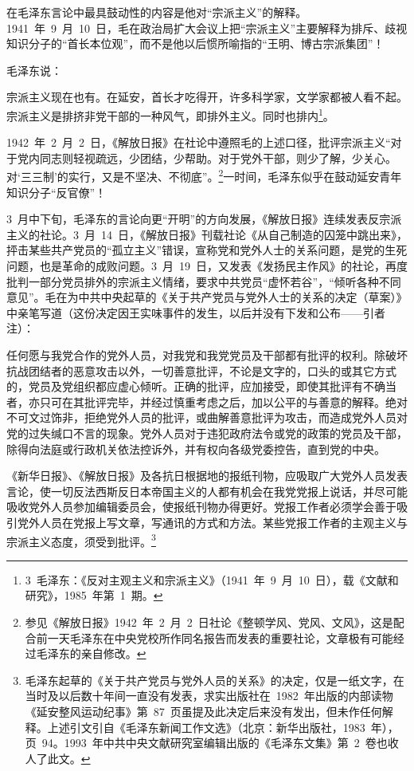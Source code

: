 在毛泽东言论中最具鼓动性的内容是他对“宗派主义”的解释。1941~年~9~月~10~日，毛在政治局扩大会议上把“宗派主义”主要解释为排斥、歧视知识分子的“首长本位观”，而不是他以后惯所喻指的“王明、博古宗派集团”！

毛泽东说：

\begin{quoting}
宗派主义现在也有。在延安，首长才吃得开，许多科学家，文学家都被人看不起。宗派主义是排挤非党干部的一种风气，即排外主义。同时也排内\footnote{3~毛泽东：《反对主观主义和宗派主义》（1941~年~9~月~10~日），载《文献和研究》，1985~年第~1~期。}。
\end{quoting}1942~年~2~月~2~日，《解放日报》在社论中遵照毛的上述口径，批评宗派主义“对于党内同志则轻视疏远，少团结，少帮助。对于党外干部，则少了解，少关心。对‘三三制’的实行，又是不坚决、不彻底”。\footnote{参见《解放日报》1942~年~2~月~2~日社论《整顿学风、党风、文风》，这是配合前一天毛泽东在中央党校所作同名报告而发表的重要社论，文章极有可能经过毛泽东的亲自修改。}一时间，毛泽东似乎在鼓动延安青年知识分子“反官僚”！

3~月中下旬，毛泽东的言论向更“开明”的方向发展，《解放日报》连续发表反宗派主义的社论。3~月~14~日，《解放日报》刊载社论《从自己制造的囚笼中跳出来》，抨击某些共产党员的“孤立主义”错误，宣称党和党外人士的关系问题，是党的生死问题，也是革命的成败问题。3~月~19~日，又发表《发扬民主作风》的社论，再度批判一部分党员排外的宗派主义情绪，要求中共党员“虚怀若谷”，“倾听各种不同意见”。毛在为中共中央起草的《关于共产党员与党外人士的关系的决定（草案）》中亲笔写道（这份决定因王实味事件的发生，以后并没有下发和公布——引者注）：

\begin{quoting}
任何愿与我党合作的党外人员，对我党和我党党员及干部都有批评的权利。除破坏抗战团结者的恶意攻击以外，一切善意批评，不论是文字的，口头的或其它方式的，党员及党组织都应虚心倾听。正确的批评，应加接受，即使其批评有不确当者，亦只可在其批评完毕，并经过慎重考虑之后，加以公平的与善意的解释。绝对不可文过饰非，拒绝党外人员的批评，或曲解善意批评为攻击，而造成党外人员对党的过失缄口不言的现象。党外人员对于违犯政府法令或党的政策的党员及干部，除得向法庭或行政机关依法控诉外，并有权向各级党委控告，直到党的中央。

《新华日报》、《解放日报》及各抗日根据地的报纸刊物，应吸取广大党外人员发表言论，使一切反法西斯反日本帝国主义的人都有机会在我党党报上说话，并尽可能吸收党外人员参加编辑委员会，使报纸刊物办得更好。党报工作者必须学会善于吸引党外人员在党报上写文章，写通讯的方式和方法。某些党报工作者的主观主义与宗派主义态度，须受到批评。\footnote{毛泽东起草的《关于共产党员与党外人员的关系》的决定，仅是一纸文字，在当时及以后数十年间一直没有发表，求实出版社在~1982~年出版的内部读物《延安整风运动纪事》第~87~页虽提及此决定后来没有发出，但未作任何解释。上述引文引自《毛泽东新闻工作文选》（北京：新华出版社，1983~年），页~94。1993~年中共中央文献研究室编辑出版的《毛泽东文集》第~2~卷也收人了此文。}
\end{quoting}


